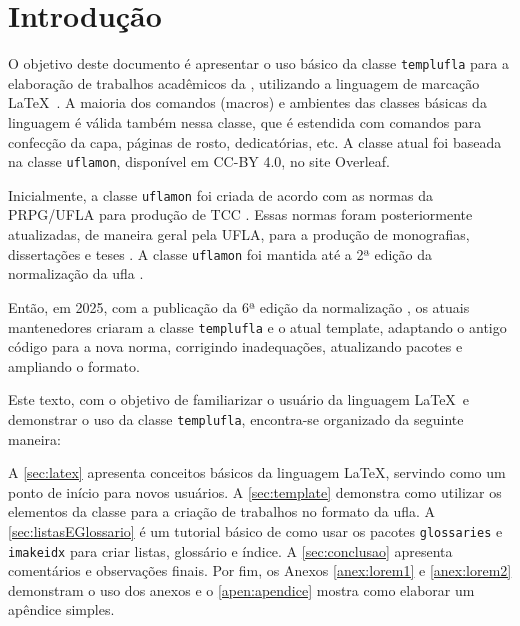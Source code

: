 \chapter{Introdução}

O objetivo deste documento é apresentar o uso básico da classe \texttt{templufla} para a elaboração de trabalhos acadêmicos da , utilizando a linguagem de marcação \LaTeX\ \cite{Lamport1994}. A maioria dos comandos (macros) e ambientes das classes básicas da linguagem é válida também nessa classe, que é estendida com comandos para confecção da capa, páginas de rosto, dedicatórias, etc. A classe atual foi baseada na classe \texttt{uflamon}, disponível em CC-BY 4.0, no site Overleaf.

Inicialmente, a classe \texttt{uflamon} foi criada de acordo com as normas da PRPG/UFLA para produção de TCC \cite{PRPG2006}. Essas normas foram posteriormente atualizadas, de maneira geral pela UFLA, para a produção de monografias, dissertações e teses \cite{BIB2010}. A classe \texttt{uflamon} foi mantida até a 2ª edição da normalização da \gls{ufla} \cite{UFLA:2015}.

Então, em 2025, com a publicação da 6ª edição da normalização \cite{UFLA:2025}, os atuais mantenedores criaram a classe \texttt{templufla} e o atual template, adaptando o antigo código para a nova norma, corrigindo inadequações, atualizando pacotes e ampliando o formato.

Este texto, com o objetivo de familiarizar o usuário da linguagem \LaTeX\ e demonstrar o uso da classe \texttt{templufla}, encontra-se organizado da seguinte maneira: 

A \autoref{sec:latex} apresenta conceitos básicos da linguagem \LaTeX, servindo como um ponto de início para novos usuários. 
A \autoref{sec:template} demonstra como utilizar os elementos da classe para a criação de trabalhos no formato da \gls{ufla}.
A \autoref{sec:listasEGlossario} é um tutorial básico de como usar os pacotes \texttt{glossaries} e \texttt{imakeidx} para criar listas, glossário e índice. 
A \autoref{sec:conclusao} apresenta comentários e observações finais.
Por fim, os Anexos \ref{anex:lorem1} e \ref{anex:lorem2} demonstram o uso dos anexos e o \autoref{apen:apendice} mostra como elaborar um apêndice simples.